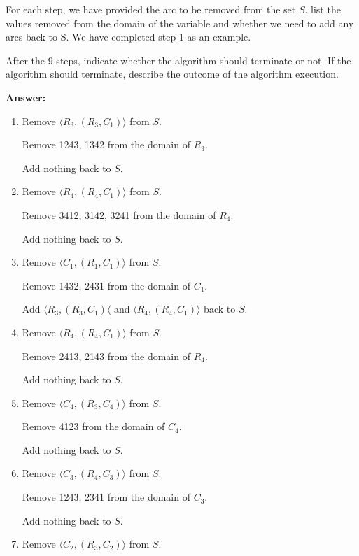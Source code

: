 \documentclass[12pt]{article}
\begin{document}
\begin{enumerate}[(a)]
For each step, we have provided the arc to be removed from the set $S$. list the values removed from the domain of the variable and whether we need to add any arcs back to S. We have completed step 1 as an example.

After the 9 steps, indicate whether the algorithm should terminate or not. If the algorithm should terminate, describe the outcome of the algorithm execution.

{\bf Answer:}

\begin{enumerate}[(1)]
\item Remove $\langle R_3, (R_3, C_1) \rangle$ from $S$.

Remove 1243, 1342 from the domain of $R_3$.

Add nothing back to $S$.

\item Remove $\langle R_4, (R_4, C_1) \rangle$ from $S$.

Remove 3412, 3142, 3241 from the domain of $R_4$.

Add nothing back to $S$.

\item Remove $\langle C_1, (R_1, C_1) \rangle$ from $S$.

Remove 1432, 2431 from the domain of $C_1$.

Add $\langle R_3, (R_3, C_1) \langle$ and $\langle R_4, (R_4, C_1) \rangle$ back to $S$.

\item Remove $\langle R_4, (R_4, C_1) \rangle$ from $S$.

Remove 2413, 2143 from the domain of $R_4$.

Add nothing back to $S$.

\item Remove $\langle C_4, (R_3, C_4) \rangle$ from $S$.

Remove 4123 from the domain of $C_4$.

Add nothing back to $S$.

\item Remove $\langle C_3, (R_4, C_3) \rangle$ from $S$.

Remove 1243, 2341 from the domain of $C_3$.

Add nothing back to $S$.

\item Remove $\langle C_2, (R_3, C_2) \rangle$ from $S$.


\end{enumerate}
\end{enumerate}
\end{document}
